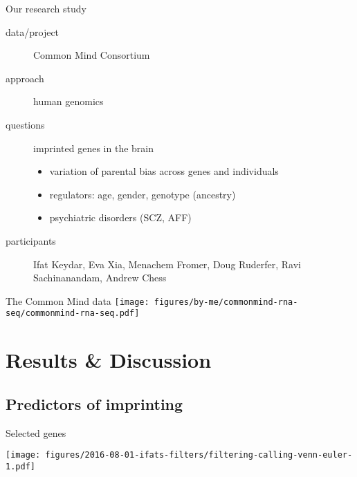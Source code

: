\documentclass{beamer}
\begin{document}
\begin{frame}{Our research study}
\begin{description}
\item[data/project] Common Mind Consortium
\item[approach] human genomics
\item[questions] imprinted genes in the brain
\begin{itemize}
\item variation of parental bias across genes and individuals
\item regulators: age, gender, genotype (ancestry)
\item psychiatric disorders (SCZ, AFF)  
\end{itemize}
\item[participants] \alert{Ifat Keydar}, Eva Xia, Menachem Fromer, Doug Ruderfer, Ravi Sachinanandam, Andrew Chess
\end{description}
\end{frame}

\begin{frame}[label=cmc]{The Common Mind data}
\texttt{[image: figures/by-me/commonmind-rna-seq/commonmind-rna-seq.pdf]}
\end{frame}

\section{Results \& Discussion}
\subsection{Predictors of imprinting}

\begin{frame}{Selected genes}
\begin{center}
\texttt{[image: figures/2016-08-01-ifats-filters/filtering-calling-venn-euler-1.pdf]}
\end{center}
\end{frame}
\end{document}
